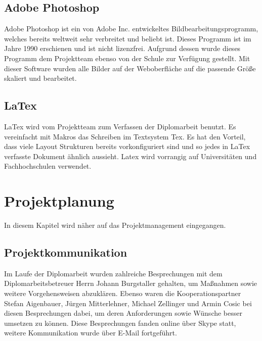 \subsection{Adobe Photoshop}
Adobe Photoshop ist ein von Adobe Inc. entwickeltes Bildbearbeitungsprogramm, welches bereits weltweit sehr verbreitet und beliebt ist. Dieses Programm ist im Jahre 1990 erschienen und ist nicht lizenzfrei. Aufgrund dessen wurde dieses Programm dem Projektteam ebenso von der Schule zur Verfügung gestellt. Mit dieser Software wurden alle Bilder auf der Weboberfläche auf die passende Größe skaliert und bearbeitet. 

\subsection{LaTex}
LaTex wird vom Projektteam zum Verfassen der Diplomarbeit benutzt. Es vereinfacht mit Makros das Schreiben im Textsystem Tex. Es hat den Vorteil, dass viele Layout Strukturen bereits vorkonfiguriert sind und so jedes in LaTex verfasste Dokument ähnlich aussieht. Latex wird vorrangig auf Universitäten und Fachhochschulen verwendet.

\newpage
\section{Projektplanung}
	
In diesem Kapitel wird näher auf das Projektmanagement eingegangen.


\subsection{Projektkommunikation}
Im Laufe der Diplomarbeit wurden zahlreiche Besprechungen mit dem Diplomarbeitsbetreuer Herrn Johann Burgstaller gehalten, um Maßnahmen sowie weitere Vorgehensweisen abzuklären. Ebenso waren die Kooperationspartner Stefan Aigenbauer, Jürgen Mitterlehner, Michael Zellinger und Armin Cosic bei diesen Besprechungen dabei, um deren Anforderungen sowie Wünsche besser umsetzen zu können. Diese Besprechungen fanden online über Skype statt, weitere Kommunikation wurde über E-Mail fortgeführt. 


